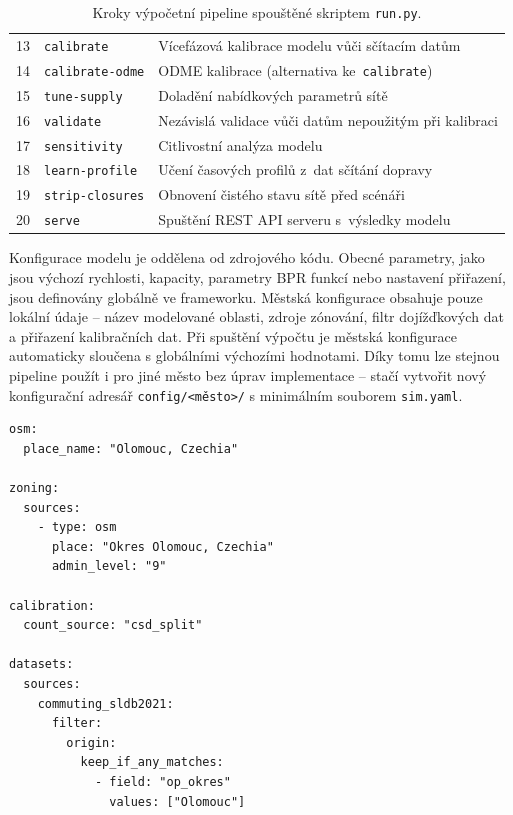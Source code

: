 \begin{table}[ht]
\begin{tabular}{rll}
13 & \texttt{calibrate}         & Vícefázová kalibrace modelu vůči sčítacím datům \\
14 & \texttt{calibrate-odme}    & ODME kalibrace (alternativa ke~\texttt{calibrate}) \\
15 & \texttt{tune-supply}       & Doladění nabídkových parametrů sítě \\
16 & \texttt{validate}          & Nezávislá validace vůči datům nepoužitým při kalibraci \\
17 & \texttt{sensitivity}       & Citlivostní analýza modelu \\
18 & \texttt{learn-profile}     & Učení časových profilů z~dat sčítání dopravy \\
19 & \texttt{strip-closures}    & Obnovení čistého stavu sítě před scénáři \\
20 & \texttt{serve}             & Spuštění REST API serveru s~výsledky modelu \\
\bottomrule
\end{tabular}
\caption{Kroky výpočetní pipeline spouštěné skriptem \texttt{run.py}.}
\label{tab:pipeline-steps}
\end{table}

Konfigurace modelu je oddělena od zdrojového kódu. Obecné parametry, jako jsou výchozí rychlosti, kapacity, parametry BPR funkcí nebo nastavení přiřazení, jsou definovány globálně ve frameworku. Městská konfigurace obsahuje pouze lokální údaje -- název modelované oblasti, zdroje zónování, filtr dojížďkových dat a přiřazení kalibračních dat. Při spuštění výpočtu je městská konfigurace automaticky sloučena s globálními výchozími hodnotami. Díky tomu lze stejnou pipeline použít i pro jiné město bez úprav implementace -- stačí vytvořit nový konfigurační adresář \texttt{config/<město>/} s minimálním souborem \texttt{sim.yaml}.

\begin{lstlisting}[language={},caption={Minimální městská konfigurace modelu (soubor \texttt{sim.yaml}).},label={lst:city-config}]
osm:
  place_name: "Olomouc, Czechia"

zoning:
  sources:
    - type: osm
      place: "Okres Olomouc, Czechia"
      admin_level: "9"

calibration:
  count_source: "csd_split"

datasets:
  sources:
    commuting_sldb2021:
      filter:
        origin:
          keep_if_any_matches:
            - field: "op_okres"
              values: ["Olomouc"]
\end{lstlisting}

